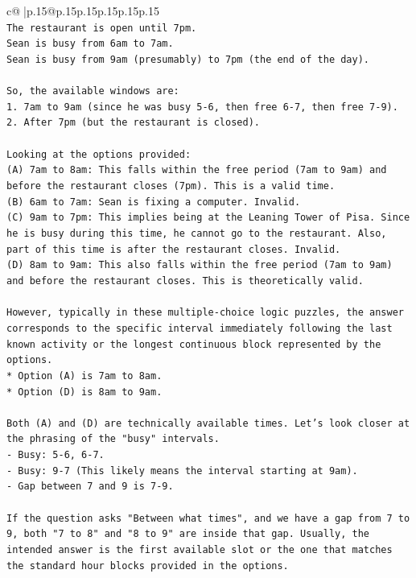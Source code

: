 \documentclass{article}
\begin{document}
{\begin{supertabular}{c@{$\;$}|p{.15\linewidth}@{}p{.15\linewidth}p{.15\linewidth}p{.15\linewidth}p{.15\linewidth}p{.15\linewidth}}
{{{\\ 
\texttt{The restaurant is open until 7pm.} \\
\texttt{Sean is busy from 6am to 7am.} \\
\texttt{Sean is busy from 9am (presumably) to 7pm (the end of the day).} \\
\\ 
\texttt{So, the available windows are:} \\
\texttt{1.  7am to 9am (since he was busy 5{-}6, then free 6{-}7, then free 7{-}9).} \\
\texttt{2.  After 7pm (but the restaurant is closed).} \\
\\ 
\texttt{Looking at the options provided:} \\
\texttt{(A) 7am to 8am: This falls within the free period (7am to 9am) and before the restaurant closes (7pm). This is a valid time.} \\
\texttt{(B) 6am to 7am: Sean is fixing a computer. Invalid.} \\
\texttt{(C) 9am to 7pm: This implies being at the Leaning Tower of Pisa. Since he is busy during this time, he cannot go to the restaurant. Also, part of this time is after the restaurant closes. Invalid.} \\
\texttt{(D) 8am to 9am: This also falls within the free period (7am to 9am) and before the restaurant closes. This is theoretically valid.} \\
\\ 
\texttt{However, typically in these multiple{-}choice logic puzzles, the answer corresponds to the specific interval immediately following the last known activity or the longest continuous block represented by the options.} \\
\texttt{*   Option (A) is 7am to 8am.} \\
\texttt{*   Option (D) is 8am to 9am.} \\
\\ 
\texttt{Both (A) and (D) are technically available times. Let's look closer at the phrasing of the "busy" intervals.} \\
\texttt{{-} Busy: 5{-}6, 6{-}7.} \\
\texttt{{-} Busy: 9{-}7 (This likely means the interval starting at 9am).} \\
\texttt{{-} Gap between 7 and 9 is 7{-}9.} \\
\\ 
\texttt{If the question asks "Between what times", and we have a gap from 7 to 9, both "7 to 8" and "8 to 9" are inside that gap. Usually, the intended answer is the first available slot or the one that matches the standard hour blocks provided in the options.} \\
}}}
\end{supertabular}}
\end{document}
